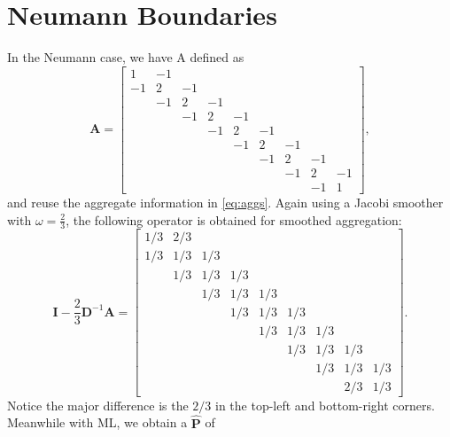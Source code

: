 \documentclass{article}
\newcommand{\mat}[1]{\bm{{#1}}}
\newcommand{\sfrac}[2]{#1/#2}
\begin{document}
\section{Neumann Boundaries}\label{sec:neumann}
In the Neumann case, we have A defined as
\begin{equation}
\mat{A} = \begin{bmatrix}
1 & -1 &  &  &  &  &  &  &  \\
-1 & 2 & -1 &  &  &  &  &  &  \\
 & -1 & 2 & -1 &  &  &  &  &  \\
 &  & -1 & 2 & -1 &  &  &  &  \\
 &  &  & -1 & 2 & -1 &  &  &  \\
 &  &  &  & -1 & 2 & -1 &  &  \\
 &  &  &  &  & -1 & 2 & -1 &  \\
 &  &  &  &  &  & -1 & 2 & -1 \\
 &  &  &  &  &  &  & -1 & 1
\end{bmatrix},
\end{equation}
and reuse the aggregate information in \eqref{eq:aggs}.  Again using a Jacobi smoother with $\omega=\frac{2}{3}$, the following operator is obtained for smoothed aggregation:
\begin{equation}
\mat{I} - \frac{2}{3}\mat{D}^{-1}\mat{A} =  \begin{bmatrix}
\sfrac{1}{3} & \sfrac{2}{3} &  &  &  &  &  &  &  \\
\sfrac{1}{3} & \sfrac{1}{3} & \sfrac{1}{3} &  &  &  &  &  &  \\
 & \sfrac{1}{3} & \sfrac{1}{3} & \sfrac{1}{3} &  &  &  &  &  \\
 &  & \sfrac{1}{3} & \sfrac{1}{3} & \sfrac{1}{3} &  &  &  &  \\
 &  &  & \sfrac{1}{3} & \sfrac{1}{3} & \sfrac{1}{3} &  &  &  \\
 &  &  &  & \sfrac{1}{3} & \sfrac{1}{3} & \sfrac{1}{3} &  &  \\
 &  &  &  &  & \sfrac{1}{3} & \sfrac{1}{3} & \sfrac{1}{3} &  \\
 &  &  &  &  &  & \sfrac{1}{3} & \sfrac{1}{3} & \sfrac{1}{3} \\
 &  &  &  &  &  &  & \sfrac{2}{3} & \sfrac{1}{3}
\end{bmatrix}.
\end{equation}
Notice the major difference is the $\sfrac{2}{3}$ in the top-left and bottom-right corners.  Meanwhile with ML, we obtain a $\mat{\hat{P}}$ of
\end{document}
